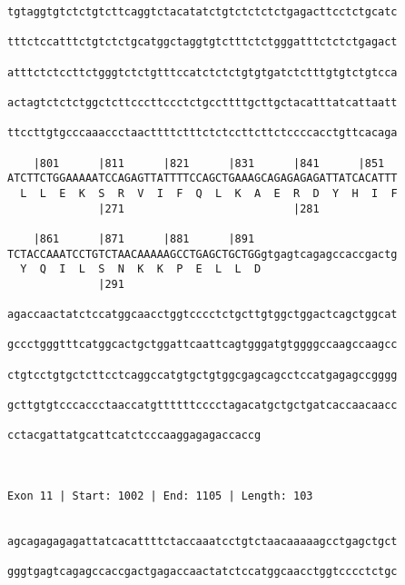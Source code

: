 \documentclass{article}
\begin{document}
\begin{Verbatim}
tgtaggtgtctctgtcttcaggtctacatatctgtctctctctgagacttcctctgcatc
                                                            
tttctccatttctgtctctgcatggctaggtgtctttctctgggatttctctctgagact
                                                            
atttctctccttctgggtctctgtttccatctctctgtgtgatctctttgtgtctgtcca
                                                            
actagtctctctggctcttcccttccctctgccttttgcttgctacatttatcattaatt
                                                            
ttccttgtgcccaaaccctaacttttctttctctccttcttctccccacctgttcacaga
                                                            
    |801      |811      |821      |831      |841      |851  
ATCTTCTGGAAAAATCCAGAGTTATTTTCCAGCTGAAAGCAGAGAGAGATTATCACATTT
  L  L  E  K  S  R  V  I  F  Q  L  K  A  E  R  D  Y  H  I  F
              |271                          |281            
  
    |861      |871      |881      |891                      
TCTACCAAATCCTGTCTAACAAAAAGCCTGAGCTGCTGGgtgagtcagagccaccgactg
  Y  Q  I  L  S  N  K  K  P  E  L  L  D                     
              |291                                          
  
agaccaactatctccatggcaacctggtcccctctgcttgtggctggactcagctggcat
                                                            
gccctgggtttcatggcactgctggattcaattcagtgggatgtggggccaagccaagcc
                                                            
ctgtcctgtgctcttcctcaggccatgtgctgtggcgagcagcctccatgagagccgggg
                                                            
gcttgtgtcccaccctaaccatgttttttcccctagacatgctgctgatcaccaacaacc
                                                            
cctacgattatgcattcatctcccaaggagagaccaccg
                                       
                                       
 
Exon 11 | Start: 1002 | End: 1105 | Length: 103


agcagagagagattatcacattttctaccaaatcctgtctaacaaaaagcctgagctgct
                                                            
gggtgagtcagagccaccgactgagaccaactatctccatggcaacctggtcccctctgc
                                                            

\end{Verbatim}
\end{document}
